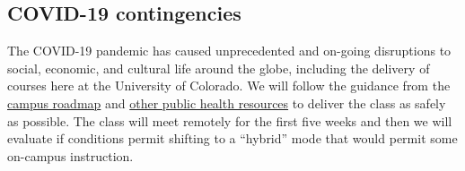 \documentclass[10pt]{memoir}
\begin{document}

\subsection{COVID-19 contingencies}
The COVID-19 pandemic has caused unprecedented and on-going disruptions to social, economic, and cultural life around the globe, including the delivery of courses here at the University of Colorado. We will follow the guidance from the \href{https://www.colorado.edu/roadmap/}{campus roadmap} and \href{https://covid19.colorado.gov/}{other public health resources} to deliver the class as safely as possible. The class will meet remotely for the first five weeks and then we will evaluate if conditions permit shifting to a ``hybrid'' mode that would permit some on-campus instruction.
\end{document}
